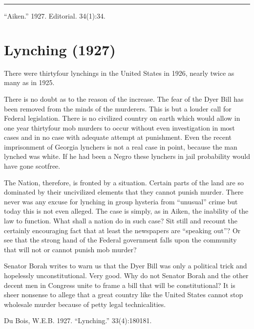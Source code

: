 \documentclass[letterpaper,10pt,english]{jupyterBook}
\begin{document}
\bigskip\hrule\bigskip


\sphinxAtStartPar
{} “Aiken.” 1927. Editorial.  34(1):34.


\section{Lynching (1927)}
\label{\detokenize{Volumes/33/04/lynching:lynching-1927}}\label{\detokenize{Volumes/33/04/lynching::doc}}
\sphinxAtStartPar
There were thirty\sphinxhyphen{}four lynchings in the United States in 1926, nearly twice as many as in 1925.

\sphinxAtStartPar
There is no doubt as to the reason of the increase. The fear of the Dyer Bill has been removed from the minds of the murderers. This is but a louder call for Federal legislation. There is no civilized country on earth which would allow in one year thirty\sphinxhyphen{}four mob murders to occur without even investigation in most cases and in no case with adequate attempt at punishment. Even the recent imprisonment of Georgia lynchers is not a real case in point, because the man lynched was white. If he had been a Negro these lynchers in jail probability would have gone scot\sphinxhyphen{}free.

\sphinxAtStartPar
The Nation, therefore, is fronted by a situation. Certain parts of the land are so dominated by their uncivilized elements that they cannot punish murder. There never was any excuse for lynching in group hysteria from “unusual” crime but today this is not even alleged. The case is simply, as in Aiken, the inability of the law to function. What shall a nation do in such case? Sit still and recount the certainly encouraging fact that at least the newspapers are “speaking out”? Or see that the strong hand of the Federal government falls upon the community that will not or cannot punish mob murder?

\sphinxAtStartPar
Senator Borah writes to warn us that the Dyer Bill was only a political trick and hopelessly unconstitutional. Very good. Why do not Senator Borah and the other decent men in Congress unite to frame a bill that will be constitutional? It is sheer nonsense to allege that a great country like the United States cannot stop wholesale murder because of petty legal technicalities.

\sphinxAtStartPar
{} Du Bois, W.E.B. 1927. “Lynching.”  33(4):180\sphinxhyphen{}181.
\end{document}
